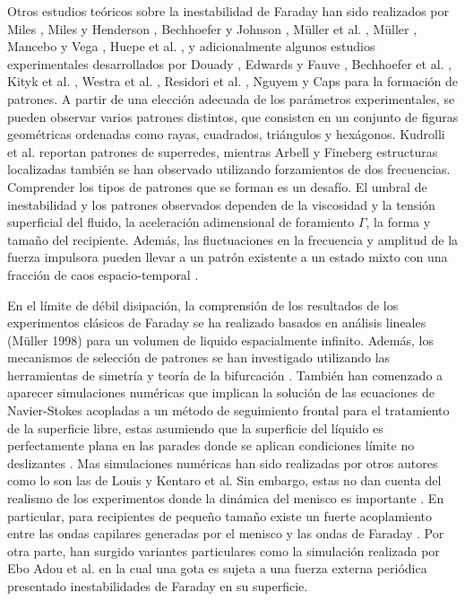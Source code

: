 Otros estudios teóricos sobre la inestabilidad de Faraday han sido realizados por Miles \cite{Miles1984, Miles1993}, Miles y Henderson \cite{Miles1990}, Bechhoefer y Johnson \cite{Bechhoefer1996}, Müller et al. \cite{Muller1997}, Müller \cite{Muller1998a}, Mancebo y Vega \cite{Mancebo2002}, Huepe et al. \cite{Huepe2006}, y adicionalmente algunos estudios experimentales desarrollados por Douady \cite{Douady1990}, Edwards y Fauve \cite{Edwards1994}, Bechhoefer et al. \cite{Bechhoefer1995}, Kityk et al. \cite{Kityk2002}, Westra et al. \cite{Westra2003}, Residori et al. \cite{Residori2007}, Nguyem y Caps \cite{NguyemThuLam2011} para la formación de patrones. A partir de una elección adecuada de los parámetros experimentales, se pueden observar varios patrones distintos, que consisten en un conjunto de figuras geométricas ordenadas como rayas, cuadrados, triángulos y hexágonos. Kudrolli et al. \cite{Kudrolli1998} reportan patrones de superredes, mientras Arbell y Fineberg \cite{Arbell2000, Arbell2002} estructuras localizadas también se han observado utilizando forzamientos de dos frecuencias. Comprender los tipos de patrones que se forman es un desafío. El umbral de inestabilidad y los patrones observados dependen de la viscosidad y la tensión superficial del fluido, la aceleración adimensional de foramiento $\Gamma$, la forma y tamaño del recipiente. Además, las fluctuaciones en la frecuencia y amplitud de la fuerza impulsora pueden llevar a un patrón existente a un estado mixto con una fracción de caos espacio-temporal \cite{Kudrolli1996}.\medskip

En el límite de débil disipación, la comprensión de los resultados de los experimentos clásicos de Faraday se ha realizado basados en análisis lineales (Müller 1998) para un volumen de liquido espacialmente infinito. Además, los mecanismos de selección de patrones se han investigado utilizando las herramientas de simetría y teoría de la bifurcación \cite{Silber2000, Skeldon2007}. También han comenzado a aparecer simulaciones numéricas que implican la solución de las ecuaciones de Navier-Stokes acopladas a un método de seguimiento frontal para el tratamiento de la superficie libre, estas asumiendo que la superficie del líquido es perfectamente plana en las parades donde se aplican condiciones límite no deslizantes \cite{Perinet2009, Kahouadji2015}. Mas simulaciones numéricas han sido realizadas por otros autores como lo son las de Louis \cite{Louis2011} y Kentaro et al. \cite{Takagi2011, Takagi2015} Sin embargo, estas no dan cuenta del realismo de los  experimentos donde la dinámica del menisco es importante \cite{Douady1990}. En particular, para recipientes de pequeño tamaño existe un fuerte acoplamiento entre las ondas capilares generadas por el menisco y las ondas de Faraday \cite{NguyemThuLam2011}. Por otra parte, han surgido variantes particulares como la simulación realizada por Ebo Adou et al. en la cual una gota es sujeta a una fuerza externa periódica presentado inestabilidades de Faraday en su superficie.\medskip 

